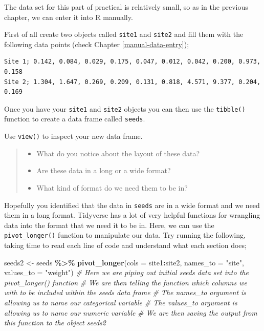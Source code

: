 \documentclass[
]{book}
\newenvironment{Shaded}{\begin{snugshade}}{\end{snugshade}}
\newcommand{\AttributeTok}[1]{\textcolor[rgb]{0.13,0.29,0.53}{#1}}
\newcommand{\CommentTok}[1]{\textcolor[rgb]{0.56,0.35,0.01}{\textit{#1}}}
\newcommand{\FunctionTok}[1]{\textcolor[rgb]{0.13,0.29,0.53}{\textbf{#1}}}
\newcommand{\NormalTok}[1]{#1}
\newcommand{\OtherTok}[1]{\textcolor[rgb]{0.56,0.35,0.01}{#1}}
\newcommand{\SpecialCharTok}[1]{\textcolor[rgb]{0.81,0.36,0.00}{\textbf{#1}}}
\newcommand{\StringTok}[1]{\textcolor[rgb]{0.31,0.60,0.02}{#1}}
\providecommand{\tightlist}{%
  \setlength{\itemsep}{0pt}\setlength{\parskip}{0pt}}
\begin{document}
The data set for this part of practical is relatively small, so as in the previous chapter, we can enter it into R manually.

First of all create two objects called \texttt{site1} and \texttt{site2} and fill them with the following data points (check Chapter \ref{manual-data-entry});

\begin{verbatim}
Site 1; 0.142, 0.084, 0.029, 0.175, 0.047, 0.012, 0.042, 0.200, 0.973, 0.158
Site 2; 1.304, 1.647, 0.269, 0.209, 0.131, 0.818, 4.571, 9.377, 0.204, 0.169
\end{verbatim}

Once you have your \texttt{site1} and \texttt{site2} objects you can then use the \texttt{tibble()} function to create a data frame called \texttt{seeds}.

Use \texttt{view()} to inspect your new data frame.

\begin{quote}
\begin{itemize}
\tightlist
\item
  What do you notice about the layout of these data?
\item
  Are these data in a long or a wide format?
\item
  What kind of format do we need them to be in?
\end{itemize}
\end{quote}

Hopefully you identified that the data in \texttt{seeds} are in a wide format and we need them in a long format. Tidyverse has a lot of very helpful functions for wrangling data into the format that we need it to be in. Here, we can use the \texttt{pivot\_longer()} function to manipulate our data. Try running the following, taking time to read each line of code and understand what each section does;

\begin{Shaded}
\begin{Highlighting}[]
\NormalTok{seeds2 }\OtherTok{\textless{}{-}}\NormalTok{ seeds }\SpecialCharTok{\%\textgreater{}\%}
  \FunctionTok{pivot\_longer}\NormalTok{(}\AttributeTok{cols =}\NormalTok{ site1}\SpecialCharTok{:}\NormalTok{site2,}
             \AttributeTok{names\_to =} \StringTok{"site"}\NormalTok{, }
             \AttributeTok{values\_to =} \StringTok{"weight"}\NormalTok{)}
\CommentTok{\# Here we are piping out initial seeds data set into the pivot\_longer() function}
\CommentTok{\# We are then telling the function which columns we with to be included within the seeds data frame}
\CommentTok{\# The names\_to argument is allowing us to name our categorical variable }
\CommentTok{\# The values\_to argument is allowing us to name our numeric variable}
\CommentTok{\# We are then saving the output from this function to the object seeds2}
\end{Highlighting}
\end{Shaded}
\end{document}
